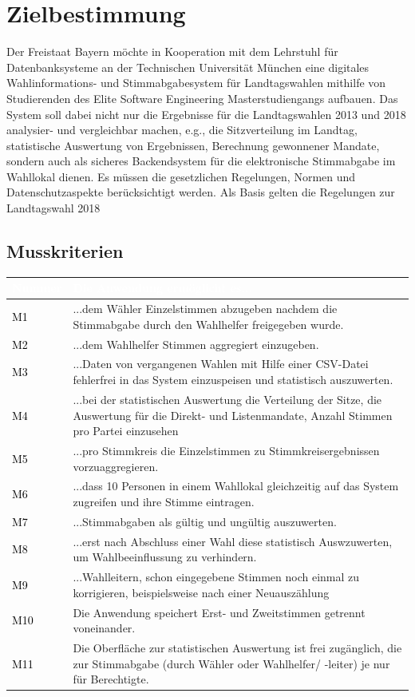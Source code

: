 \documentclass[a4paper,12pt]{article}
\newcommand\addrow[2]{\textcolor{black}{#1} &#2\\ \hline}
\newcommand\addheading[2]{\rowcolor{TUMBlue}\textcolor{white}{#1} & \textcolor{white}{#2}\\ \hline}
\newcommand\tabularhead{\begin{tabular}{|b|p{13cm}|}
\hline
}
\newenvironment{usecase}{\tabularhead}
{\hline\end{tabular}}
\begin{document}
 \setcounter{page}{2}

 \tableofcontents          %
 \clearpage
 
\section{Zielbestimmung}
Der Freistaat Bayern möchte in Kooperation mit dem Lehrstuhl für 
Datenbanksysteme an der Technischen Universität München eine digitales 
Wahlinformations- und Stimmabgabesystem für Landtagswahlen mithilfe von 
Studierenden des Elite Software Engineering Masterstudiengangs aufbauen.
%
Das System soll dabei nicht nur die Ergebnisse für die Landtagswahlen 
2013 und 2018 analysier- und vergleichbar machen, e.g., die Sitzverteilung 
im Landtag, statistische Auswertung von Ergebnissen, Berechnung gewonnener
Mandate, sondern auch als sicheres Backendsystem für die elektronische 
Stimmabgabe im Wahllokal dienen. 
%
Es müssen die gesetzlichen Regelungen, Normen und Datenschutzaspekte
berücksichtigt werden. Als Basis gelten die Regelungen zur
Landtagswahl 2018


\subsection{Musskriterien}
\begin{usecase}
	\addheading{Nummer}{Die Anwendung ermöglicht es...} 
	\addrow{M1}{...dem Wähler Einzelstimmen abzugeben nachdem die Stimmabgabe durch den Wahlhelfer freigegeben wurde.}
	\addrow{M2}{...dem Wahlhelfer Stimmen aggregiert einzugeben.}
	\addrow{M3}{...Daten von vergangenen Wahlen mit Hilfe einer CSV-Datei fehlerfrei in das System einzuspeisen und statistisch auszuwerten.}
	\addrow{M4}{...bei der statistischen Auswertung die Verteilung der Sitze, die Auswertung für die Direkt- und Listenmandate, Anzahl Stimmen pro Partei einzusehen}
	\addrow{M5}{...pro Stimmkreis die Einzelstimmen zu Stimmkreisergebnissen vorzuaggregieren.}
	\addrow{M6}{...dass 10 Personen in einem Wahllokal gleichzeitig auf das System zugreifen und ihre Stimme eintragen.}
	\addrow{M7}{...Stimmabgaben als gültig und ungültig auszuwerten.}
	\addrow{M8}{...erst nach Abschluss einer Wahl diese statistisch Auswzuwerten, um Wahlbeeinflussung zu verhindern.}
	\addrow{M9}{...Wahlleitern, schon eingegebene Stimmen noch einmal zu korrigieren, beispielsweise nach einer Neuauszählung}
	\addrow{M10}{Die Anwendung speichert Erst- und Zweitstimmen getrennt voneinander.}
	\addrow{M11}{Die Oberfläche zur statistischen Auswertung ist frei zugänglich, die zur Stimmabgabe (durch Wähler oder Wahlhelfer/ -leiter) je nur für Berechtigte.}
	
\end{usecase}
\end{document}
